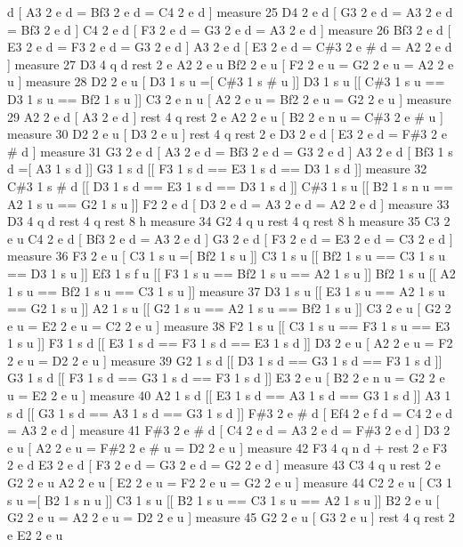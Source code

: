 d \mbox{[} A3 2 e d = Bf3 2 e d = C4 2 e d \mbox{]} measure 25 D4 2 e d \mbox{[} G3 2 e d = A3 2 e d = Bf3 2 e d \mbox{]} C4 2 e d \mbox{[} F3 2 e d = G3 2 e d = A3 2 e d \mbox{]} measure 26 Bf3 2 e d \mbox{[} E3 2 e d = F3 2 e d = G3 2 e d \mbox{]} A3 2 e d \mbox{[} E3 2 e d = C\#3 2 e \# d = A2 2 e d \mbox{]} measure 27 D3 4 q d rest 2 e A2 2 e u Bf2 2 e u \mbox{[} F2 2 e u = G2 2 e u = A2 2 e u \mbox{]} measure 28 D2 2 e u \mbox{[} D3 1 s u =\mbox{[} C\#3 1 s \# u \mbox{]}\mbox{]} D3 1 s u \mbox{[}\mbox{[} C\#3 1 s u == D3 1 s u == Bf2 1 s u \mbox{]}\mbox{]} C3 2 e n u \mbox{[} A2 2 e u = Bf2 2 e u = G2 2 e u \mbox{]} measure 29 A2 2 e d \mbox{[} A3 2 e d \mbox{]} rest 4 q rest 2 e A2 2 e u \mbox{[} B2 2 e n u = C\#3 2 e \# u \mbox{]} measure 30 D2 2 e u \mbox{[} D3 2 e u \mbox{]} rest 4 q rest 2 e D3 2 e d \mbox{[} E3 2 e d = F\#3 2 e \# d \mbox{]} measure 31 G3 2 e d \mbox{[} A3 2 e d = Bf3 2 e d = G3 2 e d \mbox{]} A3 2 e d \mbox{[} Bf3 1 s d =\mbox{[} A3 1 s d \mbox{]}\mbox{]} G3 1 s d \mbox{[}\mbox{[} F3 1 s d == E3 1 s d == D3 1 s d \mbox{]}\mbox{]} measure 32 C\#3 1 s \# d \mbox{[}\mbox{[} D3 1 s d == E3 1 s d == D3 1 s d \mbox{]}\mbox{]} C\#3 1 s u \mbox{[}\mbox{[} B2 1 s n u == A2 1 s u == G2 1 s u \mbox{]}\mbox{]} F2 2 e d \mbox{[} D3 2 e d = A3 2 e d = A2 2 e d \mbox{]} measure 33 D3 4 q d rest 4 q rest 8 h measure 34 G2 4 q u rest 4 q rest 8 h measure 35 C3 2 e u C4 2 e d \mbox{[} Bf3 2 e d = A3 2 e d \mbox{]} G3 2 e d \mbox{[} F3 2 e d = E3 2 e d = C3 2 e d \mbox{]} measure 36 F3 2 e u \mbox{[} C3 1 s u =\mbox{[} Bf2 1 s u \mbox{]}\mbox{]} C3 1 s u \mbox{[}\mbox{[} Bf2 1 s u == C3 1 s u == D3 1 s u \mbox{]}\mbox{]} Ef3 1 s f u \mbox{[}\mbox{[} F3 1 s u == Bf2 1 s u == A2 1 s u \mbox{]}\mbox{]} Bf2 1 s u \mbox{[}\mbox{[} A2 1 s u == Bf2 1 s u == C3 1 s u \mbox{]}\mbox{]} measure 37 D3 1 s u \mbox{[}\mbox{[} E3 1 s u == A2 1 s u == G2 1 s u \mbox{]}\mbox{]} A2 1 s u \mbox{[}\mbox{[} G2 1 s u == A2 1 s u == Bf2 1 s u \mbox{]}\mbox{]} C3 2 e u \mbox{[} G2 2 e u = E2 2 e u = C2 2 e u \mbox{]} measure 38 F2 1 s u \mbox{[}\mbox{[} C3 1 s u == F3 1 s u == E3 1 s u \mbox{]}\mbox{]} F3 1 s d \mbox{[}\mbox{[} E3 1 s d == F3 1 s d == E3 1 s d \mbox{]}\mbox{]} D3 2 e u \mbox{[} A2 2 e u = F2 2 e u = D2 2 e u \mbox{]} measure 39 G2 1 s d \mbox{[}\mbox{[} D3 1 s d == G3 1 s d == F3 1 s d \mbox{]}\mbox{]} G3 1 s d \mbox{[}\mbox{[} F3 1 s d == G3 1 s d == F3 1 s d \mbox{]}\mbox{]} E3 2 e u \mbox{[} B2 2 e n u = G2 2 e u = E2 2 e u \mbox{]} measure 40 A2 1 s d \mbox{[}\mbox{[} E3 1 s d == A3 1 s d == G3 1 s d \mbox{]}\mbox{]} A3 1 s d \mbox{[}\mbox{[} G3 1 s d == A3 1 s d == G3 1 s d \mbox{]}\mbox{]} F\#3 2 e \# d \mbox{[} Ef4 2 e f d = C4 2 e d = A3 2 e d \mbox{]} measure 41 F\#3 2 e \# d \mbox{[} C4 2 e d = A3 2 e d = F\#3 2 e d \mbox{]} D3 2 e u \mbox{[} A2 2 e u = F\#2 2 e \# u = D2 2 e u \mbox{]} measure 42 F3 4 q n d + rest 2 e F3 2 e d E3 2 e d \mbox{[} F3 2 e d = G3 2 e d = G2 2 e d \mbox{]} measure 43 C3 4 q u rest 2 e G2 2 e u A2 2 e u \mbox{[} E2 2 e u = F2 2 e u = G2 2 e u \mbox{]} measure 44 C2 2 e u \mbox{[} C3 1 s u =\mbox{[} B2 1 s n u \mbox{]}\mbox{]} C3 1 s u \mbox{[}\mbox{[} B2 1 s u == C3 1 s u == A2 1 s u \mbox{]}\mbox{]} B2 2 e u \mbox{[} G2 2 e u = A2 2 e u = D2 2 e u \mbox{]} measure 45 G2 2 e u \mbox{[} G3 2 e u \mbox{]} rest 4 q rest 2 e E2 2 e u 